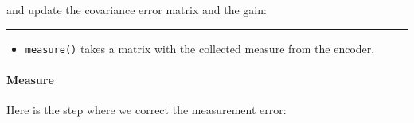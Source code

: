 and update the covariance error matrix and the gain:

\begin{Shaded}
\begin{Highlighting}[]
\OperatorTok{(*}\OperatorTok{)} \OperatorTok{=} \OperatorTok{(*}\OperatorTok{)} \OperatorTok{*} \OperatorTok{(*}\OperatorTok{)} \OperatorTok{*} \OperatorTok{(}\OperatorTok{{-}\textgreater{}}\OperatorTok{())} \OperatorTok{+} \OperatorTok{(*}\OperatorTok{);}

\OperatorTok{*}\OperatorTok{=} \OperatorTok{(}\OperatorTok{);}
\OperatorTok{(*}\OperatorTok{)} \OperatorTok{=} \OperatorTok{(*}\OperatorTok{)} \OperatorTok{*} \OperatorTok{(*}\OperatorTok{)} \OperatorTok{*} \OperatorTok{(}\OperatorTok{{-}\textgreater{}}\OperatorTok{())} \OperatorTok{+} \OperatorTok{(*}\OperatorTok{);}
\OperatorTok{(*}\OperatorTok{)} \OperatorTok{=} \OperatorTok{((*}\OperatorTok{)} \OperatorTok{*} \OperatorTok{(}\OperatorTok{{-}\textgreater{}}\OperatorTok{()))} \OperatorTok{*} \OperatorTok{(}\OperatorTok{{-}\textgreater{}}\OperatorTok{());}
\end{Highlighting}
\end{Shaded}

\begin{center}\rule{0.5\linewidth}{0.5pt}\end{center}

\begin{itemize}
\tightlist
\item
  \texttt{measure()} takes a matrix with the collected measure from the
  encoder.
\end{itemize}

\hypertarget{measure}{%
\paragraph{Measure}\label{measure}}

Here is the step where we correct the measurement error:

